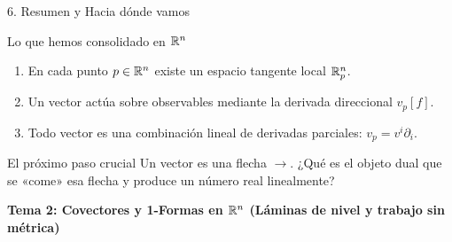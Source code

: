 \documentclass[10pt,aspectratio=169]{beamer}
\begin{document}
\begin{frame}{6. Resumen y Hacia dónde vamos}
  \begin{block}{Lo que hemos consolidado en $\mathbb{R}^n$}
    \begin{enumerate}
      \item En cada punto $p \in \mathbb{R}^n$ existe un espacio tangente local $\mathbb{R}^n_p$.
      \item Un vector actúa sobre observables mediante la derivada direccional $v_p[f]$.
      \item Todo vector es una combinación lineal de derivadas parciales: $v_p = v^i \partial_i$.
    \end{enumerate}
  \end{block}
  \vspace{0.2cm}
  \begin{alertblock}{El próximo paso crucial}
    Un vector es una flecha $\longrightarrow$. ¿Qué es el objeto dual que se «come» esa flecha y produce un número real linealmente?
    \begin{center}
      \textbf{Tema 2: Covectores y 1-Formas en $\mathbb{R}^n$ (Láminas de nivel y trabajo sin métrica)}
    \end{center}
  \end{alertblock}
\end{frame}
\end{document}
